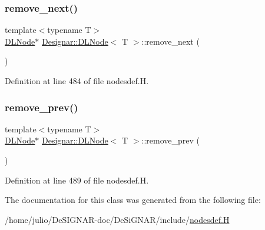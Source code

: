 \subsubsection{\texorpdfstring{remove\+\_\+next()}{remove\_next()}}
{\footnotesize\ttfamily template$<$typename T$>$ \\
\hyperlink{class_designar_1_1_d_l_node}{D\+L\+Node}$\ast$ \hyperlink{class_designar_1_1_d_l_node}{Designar\+::\+D\+L\+Node}$<$ T $>$\+::remove\+\_\+next (\begin{DoxyParamCaption}{ }\end{DoxyParamCaption})\hspace{0.3cm}{\ttfamily [inline]}}



Definition at line 484 of file nodesdef.\+H.

\mbox{\label{class_designar_1_1_d_l_node_a0bd2bf491ab61ab3fd1eb6b8b06dcae5}} 
\subsubsection{\texorpdfstring{remove\+\_\+prev()}{remove\_prev()}}
{\footnotesize\ttfamily template$<$typename T$>$ \\
\hyperlink{class_designar_1_1_d_l_node}{D\+L\+Node}$\ast$ \hyperlink{class_designar_1_1_d_l_node}{Designar\+::\+D\+L\+Node}$<$ T $>$\+::remove\+\_\+prev (\begin{DoxyParamCaption}{ }\end{DoxyParamCaption})\hspace{0.3cm}{\ttfamily [inline]}}



Definition at line 489 of file nodesdef.\+H.



The documentation for this class was generated from the following file\+:\begin{DoxyCompactItemize}
\item 
/home/julio/\+De\+S\+I\+G\+N\+A\+R-\/doc/\+De\+Si\+G\+N\+A\+R/include/\hyperlink{nodesdef_8_h}{nodesdef.\+H}\end{DoxyCompactItemize}
